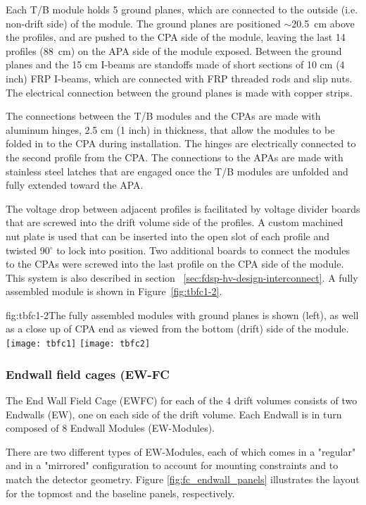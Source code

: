 Each T/B module holds 5 ground planes, which are connected to the outside (i.e. non-drift side) of the module. The ground planes are positioned $\sim$20.5~cm above the profiles, and are pushed to the CPA side of the module, leaving the last 14 profiles (88~cm) on the APA side of the module exposed. Between the ground planes and the 15 cm I-beams are standoffs made of short sections of 10 cm (4 inch)  FRP I-beams, which are connected with FRP threaded rods and slip nuts. The electrical connection between the ground planes is made with copper strips.

The connections between the T/B modules and the CPAs are made with aluminum hinges, 2.5 cm (1 inch) in thickness, that allow the modules to be folded in to the CPA during installation. The hinges are electrically connected to the second profile from the CPA. The connections to the APAs are made with stainless steel latches that are engaged once the T/B modules are unfolded and fully extended toward the APA.

The voltage drop between adjacent profiles is facilitated by voltage divider boards that are screwed into the drift volume side of the profiles. A custom machined nut plate is used that can be inserted into the open slot of each profile and twisted 90$^\circ$ to lock into position. Two additional boards to connect the modules to the CPAs were screwed into the last profile on the CPA side of the module. This system is also described in section ~\ref{sec:fdsp-hv-design-interconnect}. A fully assembled module is shown in Figure~\ref{fig:tbfc1-2}.

\begin{dunefigure}{fig:tbfc1-2}{The fully assembled modules with ground planes is shown (left), as well as a close up of CPA end as viewed from the bottom (drift) side of the module.}
\texttt{[image: tbfc1]}
\texttt{[image: tbfc2]}
\end{dunefigure}


\subsubsection{ Endwall field cages (EW-FC}

The End Wall Field Cage (EWFC) for each of the 4 drift volumes consists of two Endwalls (EW), one on each side of the drift volume. Each Endwall is in turn composed of 8 Endwall Modules (EW-Modules). 

There are two different types of EW-Modules, each of which comes in a "regular" and in a "mirrored" configuration to account for 
mounting constraints and to match the detector geometry. Figure \ref{fig:fc_endwall_panels} illustrates the layout for the topmost 
and the baseline panels, respectively.

